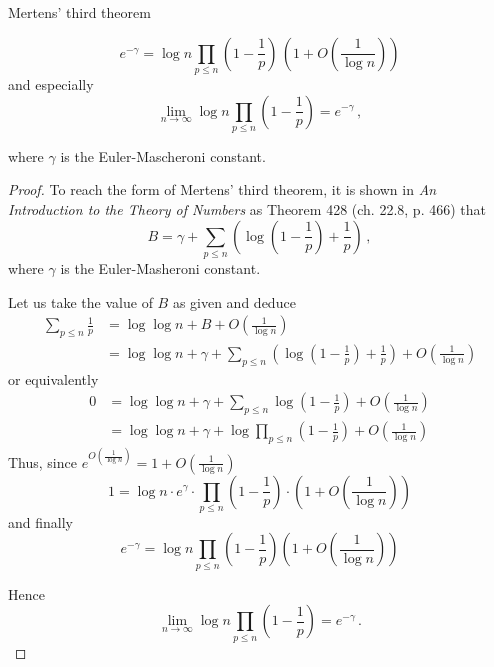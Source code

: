 \documentclass{article}
\begin{document}
\begin{theorem}
Mertens' third theorem \emph{\cite{HardyWright}}
\label{thm:mertens3}

\begin{equation*}
    e^{-\gamma} = \log n \prod_{p\le n} \left(1-\frac{1}{p}\right)\,\left(1+O\left(\frac{1}{\log n}\right)\right)
\end{equation*}
and especially
\begin{equation*}
    \lim_{n \rightarrow \infty} \log n \prod_{p\leq n} \left(1-\frac{1}{p}\right) = e^{-\gamma}\,,
\end{equation*}

where $\gamma$ is the Euler-Mascheroni constant.

\begin{proof}
To reach the form of Mertens' third theorem, it is shown in \textit{An Introduction to the Theory of Numbers} \cite{HardyWright} as Theorem 428 (ch. 22.8, p. 466) that
\begin{equation*}
    B = \gamma + \sum_{p\leq n} \left(\log \left(1-\frac{1}{p}\right)+\frac{1}{p}\right)\,,
\end{equation*}
where $\gamma$ is the Euler-Masheroni constant.

Let us take the value of $B$ as given and deduce
\begin{align*}
    \sum_{p\leq n} \frac{1}{p} & = \log\log n + B + O\left(\frac{1}{\log n}\right)\\
    & = \log\log n + \gamma + \sum_{p\leq n} \left(\log \left(1-\frac{1}{p}\right)+\frac{1}{p}\right) + O\left(\frac{1}{\log n}\right)
\end{align*}
or equivalently
\begin{align*}
    0 & = \log\log n + \gamma + \sum_{p\leq n} \log \left(1-\frac{1}{p}\right) + O\left(\frac{1}{\log n}\right)\\
    & = \log\log n + \gamma + \log \prod_{p\leq n} \left(1-\frac{1}{p}\right) + O\left(\frac{1}{\log n}\right)
\end{align*}
Thus, since $e^{O\left(\frac{1}{\log n}\right)}=1+O\left(\frac{1}{\log n}\right)$ \cite[p. 9]{Rosen}
\begin{equation*}
    1 = \log n \cdot e^\gamma \cdot \prod_{p\leq n} \left(1-\frac{1}{p}\right) \cdot \left(1+O\left(\frac{1}{\log n}\right)\right)
\end{equation*}
and finally
\begin{equation*}
    e^{-\gamma} = \log n \prod_{p\le n} \left(1-\frac{1}{p}\right) \left(1+O\left(\frac{1}{\log n}\right)\right)
\end{equation*}

Hence
\begin{equation*}
    \lim_{n \rightarrow \infty} \log n \prod_{p\leq n} \left(1-\frac{1}{p}\right) = e^{-\gamma}\,.
\end{equation*}
\end{proof}

\end{theorem}
\end{document}
